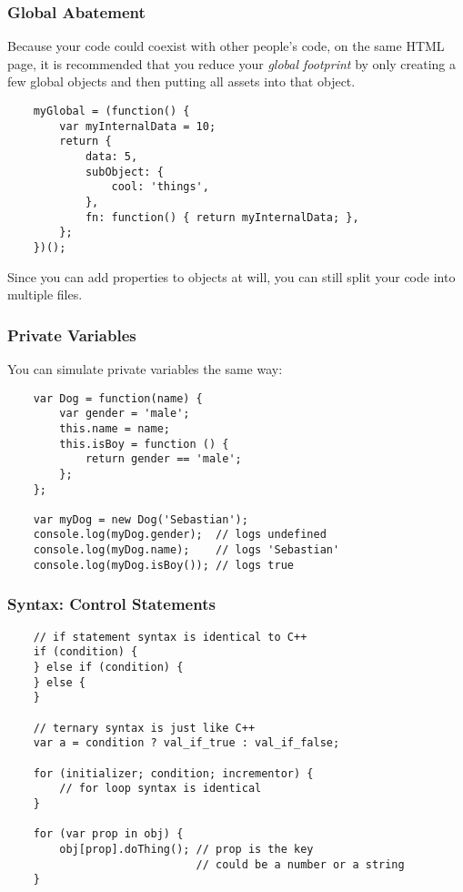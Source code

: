 \documentclass{lug}
\begin{document}
\begin{frame}[fragile]
    \frametitle{Global Abatement}
    Because your code could coexist with other people's code, on the same HTML page, it is
    recommended that you reduce your \textit{global footprint} by only creating a few global objects
    and then putting all assets into that object.

    \begin{verbatim}
    myGlobal = (function() {
        var myInternalData = 10;
        return {
            data: 5,
            subObject: {
                cool: 'things',
            },
            fn: function() { return myInternalData; },
        };
    })();
    \end{verbatim}

    Since you can add properties to objects at will, you can still split your code into multiple
    files.
\end{frame}

\begin{frame}[fragile]
    \frametitle{Private Variables}

    You can simulate private variables the same way:

    \begin{verbatim}
    var Dog = function(name) {
        var gender = 'male';
        this.name = name;
        this.isBoy = function () {
            return gender == 'male';
        };
    };

    var myDog = new Dog('Sebastian');
    console.log(myDog.gender);  // logs undefined
    console.log(myDog.name);    // logs 'Sebastian'
    console.log(myDog.isBoy()); // logs true
    \end{verbatim}
\end{frame}

\begin{frame}[fragile]
    \frametitle{Syntax: Control Statements}

    \begin{verbatim}
    // if statement syntax is identical to C++
    if (condition) {
    } else if (condition) {
    } else {
    }

    // ternary syntax is just like C++
    var a = condition ? val_if_true : val_if_false;

    for (initializer; condition; incrementor) {
        // for loop syntax is identical
    }

    for (var prop in obj) {
        obj[prop].doThing(); // prop is the key
                             // could be a number or a string
    }
    \end{verbatim}
\end{frame}
\end{document}
